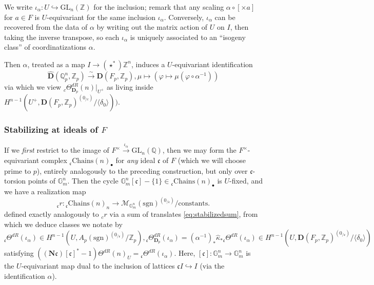 \documentclass[10pt]{amsart}
\theoremstyle{definition}
\newcommand{\Z}{\mathbb{Z}}
\newcommand{\Q}{\mathbb{Q}}
\renewcommand{\c}{\mathfrak{c}}
\newcommand{\D}{\mathbf{D}}
\newcommand{\sgn}{\mathrm{sgn}}
\newcommand{\Chains}{\mathrm{Chains}}
\newcommand{\G}{\mathbb{G}}
\newcommand{\GL}{\mathrm{GL}}
\numberwithin{equation}{section}
\begin{document}
    We write $\iota_\alpha: U\hookrightarrow \GL_n(\Z)$ for the inclusion; remark that any scaling $\alpha \circ [\times a]$ for $a\in F$ is $U$-equivariant for the same inclusion $\iota_\alpha$. Conversely, $\iota_\alpha$ can be recovered from the data of $\alpha$ by writing out the matrix action of $U$ on $I$, then taking the inverse transpose, so each $\iota_\alpha$ is uniquely associated to an ``isogeny class'' of coordinatizations $\alpha$.

    Then $\alpha$, treated as a map $I\to (\star^*)\Z^n$, induces a $U$-equivariant identification
    \begin{equation} \label{eq:distrocoord}
        \hat{\D}(\Q_p^n,\Z_p)\xrightarrow{\sim} \D(F_p,\Z_p), \mu\mapsto (\varphi\mapsto \mu(\varphi \circ \alpha^{-1}))
    \end{equation}
    via which we view ${}_c\Theta^{dR}_{\D_p}(n)|_{U^+}$ as living inside $H^{n-1}(U^+, \D(F_p, \Z_p)^{(0_{/c})}/\langle \delta_0\rangle))$.

    \subsubsection{Stabilizing at ideals of $F$}
    If we \emph{first} restrict to the image of $F^\times \xrightarrow{\iota_\alpha} \GL_n(\Q)$, then we may form the $F^\times$-equivariant complex ${}_\c\Chains(n)_\bullet$ for \emph{any} ideal $\c$ of $F$ (which we will choose prime to $p$), entirely analogously to the preceding construction, but only over $\c$-torsion points of $\G_m^n$. Then the cycle $\G_m^n[\c]-\{1\}\in {}_\c\Chains(n)_\bullet$ is $U$-fixed, and we have a realization map
    \[
        {}_\c r: {}_\c\Chains(n)_n \to \mathcal{M}_{\G_m^n}(\sgn)^{(0_{/\c})}/\mathrm{constants}.
    \]
    defined exactly analogously to ${}_cr$ via a sum of translates \eqref{eq:stabilizedsum}, from which we deduce classes we notate by
    \begin{equation} \label{eq:driotaalpha}
        {}_\c\Theta^{dR}(\iota_\alpha)\in H^{n-1}(U, A_p(\sgn)^{(0_{/\c})}/\Z_p), {}_\c\Theta^{dR}_{\D_p}(\iota_\alpha)=(\alpha^{-1})_*\widehat{\kappa}_* {}_\c\Theta^{dR}(\iota_\alpha)\in H^{n-1}(U, \D(F_p, \Z_p)^{(0_{/\c})}/\langle \delta_0\rangle)
    \end{equation}
    satisfying $((\mathbf{N}\c)[\c]^*-1) \Theta^{dR}(n)
    _U= {}_\c\Theta^{dR}(\iota_\alpha)$. Here, $[\c]:\G_m^n\to \G_m^n$ is the $U$-equivariant map dual to the inclusion of lattices $\c I\hookrightarrow I$ (via the identification $\alpha$).
    
\end{document}
